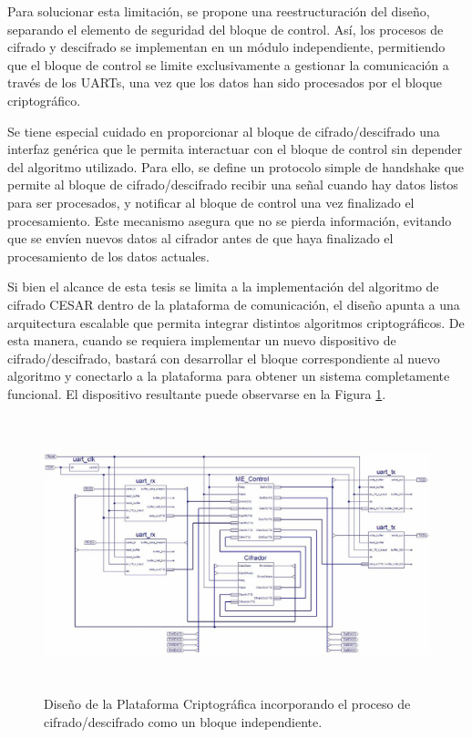 Para solucionar esta limitación, se propone una reestructuración del diseño, separando el elemento de seguridad del bloque de control. Así, los procesos de cifrado y descifrado se implementan en un módulo independiente, permitiendo que el bloque de control se limite exclusivamente a gestionar la comunicación a través de los UARTs, una vez que los datos han sido procesados por el bloque criptográfico.

Se tiene especial cuidado en proporcionar al bloque de cifrado/descifrado una interfaz genérica que le permita interactuar con el bloque de control sin depender del algoritmo utilizado. Para ello, se define un protocolo simple de handshake que permite al bloque de cifrado/descifrado recibir una señal cuando hay datos listos para ser procesados, y notificar al bloque de control una vez finalizado el procesamiento. Este mecanismo asegura que no se pierda información, evitando que se envíen nuevos datos al cifrador antes de que haya finalizado el procesamiento de los datos actuales.

Si bien el alcance de esta tesis se limita a la implementación del algoritmo de cifrado CESAR dentro de la plataforma de comunicación, el diseño apunta a una arquitectura escalable que permita integrar distintos algoritmos criptográficos. De esta manera, cuando se requiera implementar un nuevo dispositivo de cifrado/descifrado, bastará con desarrollar el bloque correspondiente al nuevo algoritmo y conectarlo a la plataforma para obtener un sistema completamente funcional. El dispositivo resultante puede observarse en la Figura \ref{fig:imagen7}.

\begin{figure}[h!] %
    \centering %
     \includegraphics[width=1\textwidth, height=8cm]{imagenes/img7} %
    \caption{ Diseño de la Plataforma Criptográfica incorporando el proceso de cifrado/descifrado 
como un bloque independiente.}
    \label{fig:imagen7} %
\end{figure} 


